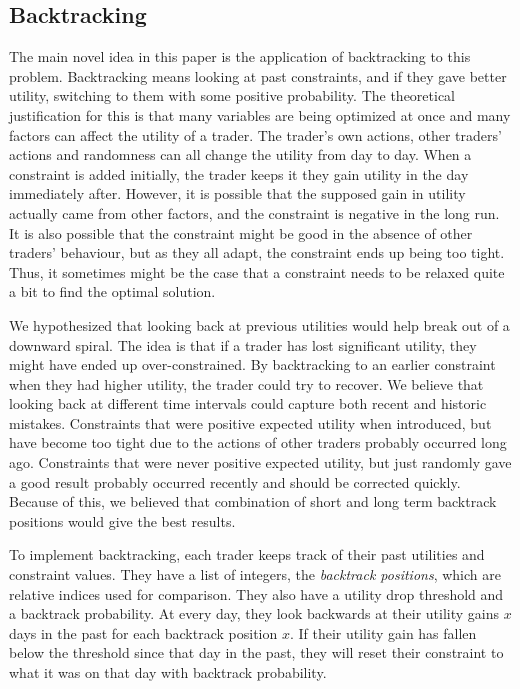 \documentclass[12pt,a4paper,titlepage]{article}
\begin{document}
\subsection{Backtracking}\label{backtrack}

The main novel idea in this paper is the application of backtracking to this problem.
Backtracking means looking at past constraints, and if they gave better utility, switching to them with some positive probability.
The theoretical justification for this is that many variables are being optimized at once and many factors can affect the utility of a trader.
The trader's own actions, other traders' actions and randomness can all change the utility from day to day.
When a constraint is added initially, the trader keeps it they gain utility in the day immediately after.
However, it is possible that the supposed gain in utility actually came from other factors, and the constraint is negative in the long run.
It is also possible that the constraint might be good in the absence of other traders' behaviour, but as they all adapt, the constraint ends up being too tight.
Thus, it sometimes might be the case that a constraint needs to be relaxed quite a bit to find the optimal solution.

We hypothesized that looking back at previous utilities would help break out of a downward spiral.
The idea is that if a trader has lost significant utility, they might have ended up over-constrained.
By backtracking to an earlier constraint when they had higher utility, the trader could try to recover.
We believe that looking back at different time intervals could capture both recent and historic mistakes.
Constraints that were positive expected utility when introduced, but have become too tight due to the actions of other traders probably occurred long ago.
Constraints that were never positive expected utility, but just randomly gave a good result probably occurred recently and should be corrected quickly.
Because of this, we believed that combination of short and long term backtrack positions would give the best results.

To implement backtracking, each trader keeps track of their past utilities and constraint values.
They have a list of integers, the \textit{backtrack positions}, which are relative indices used for comparison.
They also have a utility drop threshold and a backtrack probability.
At every day, they look backwards at their utility gains $x$ days in the past for each backtrack position $x$.
If their utility gain has fallen below the threshold since that day in the past, they will reset their constraint to what it was on that day with backtrack probability.
\end{document}
